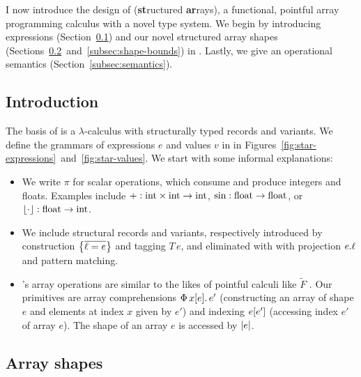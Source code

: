I now introduce the design of \textbf{\starr{}} (\textbf{st}ructured \textbf{ar}rays), a functional, pointful array programming calculus with a novel type system. We begin by introducing expressions (Section~\ref{subsec:star-intro}) and our novel structured array shapes (Sections~\ref{subsec:array-shapes}~and~\ref{subsec:shape-bounds}) in \starr{}.
Lastly, we give an operational semantics  (Section~\ref{subsec:semantics}).

\subsection{Introduction}
\label{subsec:star-intro}

The basis of \starr{} is a $\lambda$-calculus with structurally typed records and variants. We define the grammars of expressions $e$ and values $v$ in \starr{} in Figures~\ref{fig:star-expressions}~and~\ref{fig:star-values}.
We start with some informal explanations:

\begin{itemize}
    \item We write $\pi$ for scalar operations, which consume and produce integers and floats. Examples include $+: \mathrm{int} \times \mathrm{int} \to \mathrm{int}$, $\mathrm{sin} : \mathrm{float} \to \mathrm{float}$, or $\lfloor \cdot \rfloor : \mathrm{float} \to \mathrm{int}$.
    \item We include structural records and variants, respectively introduced by construction $\srecordval{\overline{\ell = e}}$ and tagging $T\,e$, and eliminated with with projection ${e}{.}{\ell}$ and pattern matching. 
    \item \starr{}'s array operations are similar to the likes of pointful calculi like $\tilde F$ \cite{f-smooth}. Our primitives are array comprehensions $\sbuild{x}{e}{e'}$ (constructing an array of shape $e$ and elements at index $x$ given by $e'$) and indexing $\sindex{e}{e'}$ (accessing index $e'$ of array $e$).
    The shape of an array $e$ is accessed by $\sshape{e}$.
\end{itemize}

\subsection{Array shapes}
\label{subsec:array-shapes}

